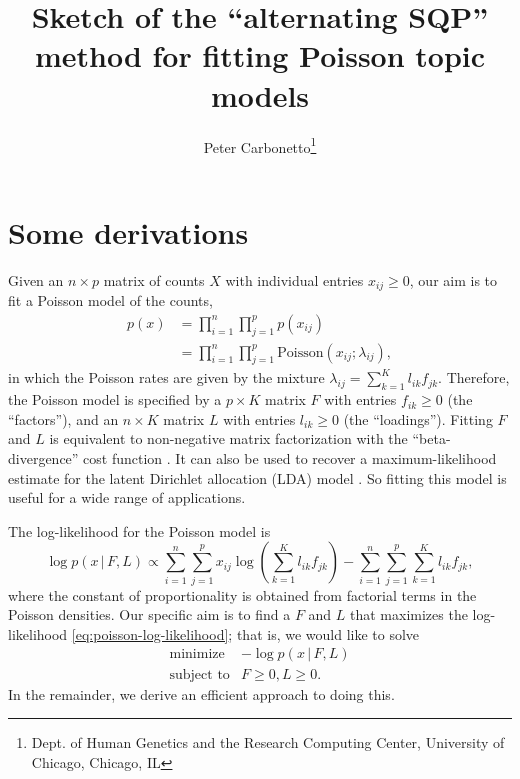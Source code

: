 \documentclass[final]{siamart171218}
\title{Sketch of the ``alternating SQP'' method for fitting Poisson
  topic models}
\author{Peter Carbonetto\thanks{Dept. of Human Genetics and the Research Computing Center, University of Chicago, Chicago, IL}}
\begin{document}
\maketitle

\section{Some derivations}

Given an $n \times p$ matrix of counts $X$ with individual entries
$x_{ij} \geq 0$, our aim is to fit a Poisson model of the counts,
\begin{align}
p(x) &= \prod_{i=1}^n \prod_{j=1}^p p(x_{ij}) \nonumber \\
     &= \prod_{i=1}^n \prod_{j=1}^p \mathrm{Poisson}(x_{ij}; \lambda_{ij}),
\label{eq:poisson-likelihood}
\end{align}
in which the Poisson rates are given by the mixture $\lambda_{ij} =
\sum_{k=1}^K l_{ik} f_{jk}$. Therefore, the Poisson model is specified
by a $p \times K$ matrix $F$ with entries $f_{ik} \geq 0$ (the
``factors''), and an $n \times K$ matrix $L$ with entries $l_{ik} \geq
0$ (the ``loadings''). Fitting $F$ and $L$ is equivalent to
non-negative matrix factorization with the ``beta-divergence'' cost
function \cite{lee-2001}. It can also be used to recover a
maximum-likelihood estimate for the latent Dirichlet allocation (LDA)
model \cite{blei-2003}. So fitting this model is useful for a wide
range of applications.

The log-likelihood for the Poisson model is
\begin{equation}
\log p(x \,|\, F, L) \propto
  \sum_{i=1}^n \sum_{j=1}^p x_{ij} \log
  ({\textstyle \sum_{k=1}^K l_{ik} f_{jk}})
    - \sum_{i=1}^n \sum_{j=1}^p \sum_{k=1}^K l_{ik} f_{jk},
\label{eq:poisson-log-likelihood}
\end{equation}
where the constant of proportionality is obtained from factorial terms
in the Poisson densities. Our specific aim is to find a $F$ and $L$
that maximizes the log-likelihood \eqref{eq:poisson-log-likelihood};
that is, we would like to solve
\begin{equation}
\begin{array}{ll}
\mbox{minimize} & -\log p(x \,|\, F, L) \\
\mbox{subject to} & F \geq 0, L \geq 0.
\end{array}
\label{eq:problem}
\end{equation}
In the remainder, we derive an efficient approach to
doing this.
\end{document}
